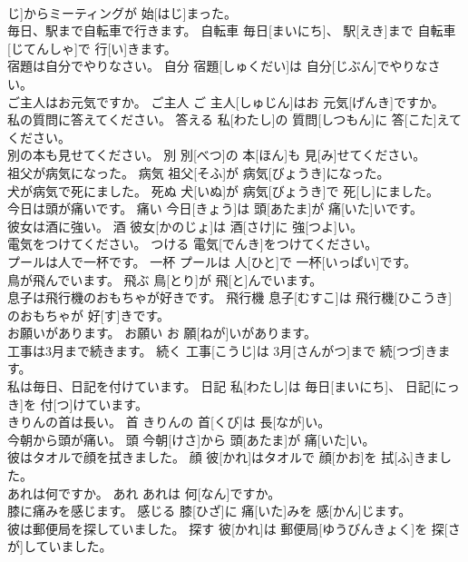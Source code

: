 \documentclass[8pt]{extreport}
\begin{document}
\begin{CJK}{UTF8}{min}
\\	じ]からミーティングが 始[はじ]まった。	
\\	毎日、駅まで自転車で行きます。	自転車	毎日[まいにち]、 駅[えき]まで 自転車[じてんしゃ]で 行[い]きます。	
\\	宿題は自分でやりなさい。	自分	宿題[しゅくだい]は 自分[じぶん]でやりなさい。	
\\	ご主人はお元気ですか。	ご主人	ご 主人[しゅじん]はお 元気[げんき]ですか。	
\\	私の質問に答えてください。	答える	私[わたし]の 質問[しつもん]に 答[こた]えてください。	
\\	別の本も見せてください。	別	別[べつ]の 本[ほん]も 見[み]せてください。	
\\	祖父が病気になった。	病気	祖父[そふ]が 病気[びょうき]になった。	
\\	犬が病気で死にました。	死ぬ	犬[いぬ]が 病気[びょうき]で 死[し]にました。	
\\	今日は頭が痛いです。	痛い	今日[きょう]は 頭[あたま]が 痛[いた]いです。	
\\	彼女は酒に強い。	酒	彼女[かのじょ]は 酒[さけ]に 強[つよ]い。	
\\	電気をつけてください。	つける	電気[でんき]をつけてください。	
\\	プールは人で一杯です。	一杯	プールは 人[ひと]で 一杯[いっぱい]です。	
\\	鳥が飛んでいます。	飛ぶ	鳥[とり]が 飛[と]んでいます。	
\\	息子は飛行機のおもちゃが好きです。	飛行機	息子[むすこ]は 飛行機[ひこうき]のおもちゃが 好[す]きです。	
\\	お願いがあります。	お願い	お 願[ねが]いがあります。	
\\	工事は3月まで続きます。	続く	工事[こうじ]は 3月[さんがつ]まで 続[つづ]きます。	
\\	私は毎日、日記を付けています。	日記	私[わたし]は 毎日[まいにち]、 日記[にっき]を 付[つ]けています。	
\\	きりんの首は長い。	首	きりんの 首[くび]は 長[なが]い。	
\\	今朝から頭が痛い。	頭	今朝[けさ]から 頭[あたま]が 痛[いた]い。	
\\	彼はタオルで顔を拭きました。	顔	彼[かれ]はタオルで 顔[かお]を 拭[ふ]きました。	
\\	あれは何ですか。	あれ	あれは 何[なん]ですか。	
\\	膝に痛みを感じます。	感じる	膝[ひざ]に 痛[いた]みを 感[かん]じます。	
\\	彼は郵便局を探していました。	探す	彼[かれ]は 郵便局[ゆうびんきょく]を 探[さが]していました。	

\end{CJK}
\end{document}
